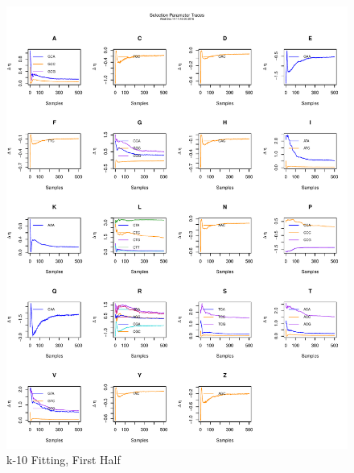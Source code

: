 \documentclass[11pt]{labbook}
\begin{document}
    \begin{figure}
        \centering
        \includegraphics[scale=.65]{FONSE_Plots/2016/December_14/k-10_selection5000}
        \caption{k-10 Fitting, First Half}
        \label{fig:k-10_1SEL}
    \end{figure}
\end{document}
